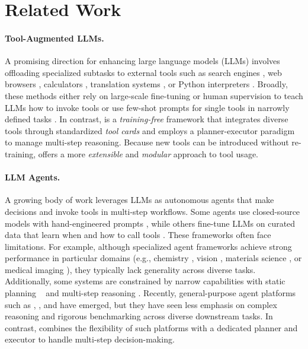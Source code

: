 \section{Related Work}
\label{sec:related}

\paragraph{Tool-Augmented LLMs.}
A promising direction for enhancing large language models (LLMs) involves offloading specialized subtasks to external tools such as search engines \citep{komeili-etal-2022-internet, thoppilan2022lamda, lazaridou2022internet, shuster2022blenderbot, yao2022react}, web browsers \citep{nakano2021webgpt}, calculators \citep{cobbe2021training, thoppilan2022lamda}, translation systems \citep{thoppilan2022lamda}, or Python interpreters \citep{gao2023pal}. Broadly, these methods either rely on large-scale fine-tuning or human supervision to teach LLMs how to invoke tools \citep{schick2023toolformer, komeili-etal-2022-internet, nakano2021webgpt, thoppilan2022lamda} or use few-shot prompts for single tools in narrowly defined tasks \citep{yao2022react, lazaridou2022internet, gao2023pal}. In contrast, \model is a \emph{training-free} framework that integrates diverse tools through standardized \emph{tool cards} and employs a planner-executor paradigm to manage multi-step reasoning. Because new tools can be introduced without re-training, \model offers a more \emph{extensible} and \emph{modular} approach to tool usage. 

\paragraph{LLM Agents.} A growing body of work leverages LLMs as autonomous agents that make decisions and invoke tools in multi-step workflows. Some agents use closed-source models with hand-engineered prompts \citep{chen2023llava, wang2024mobile}, while others fine-tune LLMs on curated data that learn when and how to call tools \cite{liu2023llava, tao2023webwise, zhang2024toolbehonest}. These frameworks often face limitations. For example, although specialized agent frameworks achieve strong performance in particular domains (e.g., chemistry \citep{bran2023chemcrow}, vision \citep{li2024mmedagent, hu2024visual}, materials science \citep{kang2024chatmof}, or medical imaging \citep{schmidgall2024agentclinic}), they typically lack generality across diverse tasks. Additionally, some systems are constrained by narrow capabilities with static planning ~\cite{lu2023chameleon} and multi-step reasoning \citep{hu2024visual}. Recently, general-purpose agent platforms such as \autogen \citep{autogen}, \gptplugin \citep{gpt4oplugin}, and \langchain \citep{langchain} have emerged, but they have seen less emphasis on complex reasoning and rigorous benchmarking across diverse downstream tasks. In contrast, \model combines the flexibility of such platforms with a dedicated planner and executor to handle multi-step decision-making. 


